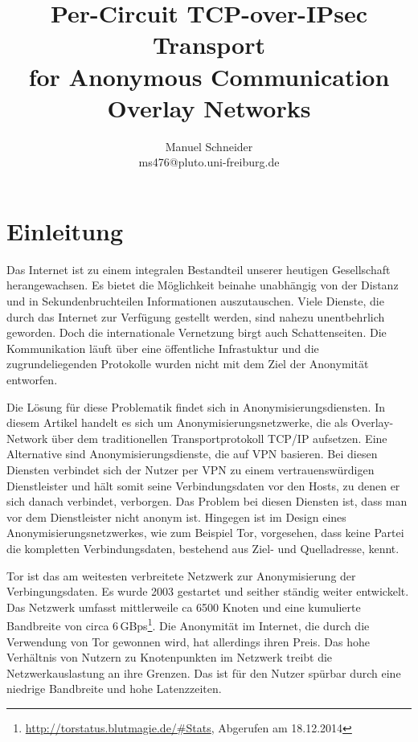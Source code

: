 \documentclass[fleqn,envcountsame,runningheads,10pt,a4paper]{llncs}
\begin{document}
\title{Per-Circuit TCP-over-IPsec Transport \\ for Anonymous Communication Overlay Networks} 
\author{Manuel Schneider \\ ms476@pluto.uni-freiburg.de}
\maketitle
\section{Einleitung}
\label{sec:intro}

Das Internet ist zu einem integralen Bestandteil unserer heutigen Gesellschaft 
herangewachsen. Es bietet die Möglichkeit beinahe unabhängig von der Distanz und 
in Sekundenbruchteilen Informationen auszutauschen. Viele Dienste, die durch das 
Internet zur Verfügung gestellt werden, sind nahezu unentbehrlich geworden. Doch 
die internationale Vernetzung birgt auch Schattenseiten. Die Kommunikation läuft 
über eine öffentliche Infrastuktur und die zugrundeliegenden Protokolle wurden 
nicht mit dem Ziel der Anonymität entworfen.

Die Lösung für diese Problematik findet sich in Anonymisierungsdiensten. In 
diesem Artikel handelt es sich um Anonymisierungsnetzwerke, die als 
Overlay-Network über dem traditionellen Transportprotokoll TCP/IP aufsetzen. 
Eine Alternative sind Anonymisierungsdienste, die auf VPN basieren. Bei diesen 
Diensten verbindet sich der Nutzer per VPN zu einem vertrauenswürdigen 
Dienstleister und hält somit seine Verbindungsdaten vor den Hosts, zu denen er 
sich danach verbindet, verborgen. Das Problem bei diesen Diensten ist, dass man 
vor dem Dienstleister nicht anonym ist. Hingegen ist im Design eines 
Anonymisierungsnetzwerkes, wie zum Beispiel Tor, vorgesehen, dass keine 
Partei die kompletten Verbindungsdaten, bestehend aus Ziel- und Quelladresse, 
kennt.

Tor ist das am weitesten verbreitete Netzwerk zur Anonymisierung der 
Verbingungsdaten. Es wurde 2003 gestartet und seither ständig weiter entwickelt. 
Das Netzwerk umfasst mittlerweile ca 6500 Knoten und eine kumulierte Bandbreite 
von circa 6\,GBps\footnote{\url{http://torstatus.blutmagie.de/\#Stats}, Abgerufen 
am 18.12.2014}.  Die Anonymität im Internet, die durch die Verwendung von 
Tor gewonnen wird, hat allerdings ihren Preis. Das hohe Verhältnis von 
Nutzern zu Knotenpunkten im Netzwerk treibt die Netzwerkauslastung an ihre 
Grenzen. Das ist für den Nutzer spürbar durch eine niedrige Bandbreite und hohe 
Latenzzeiten.
\end{document}
